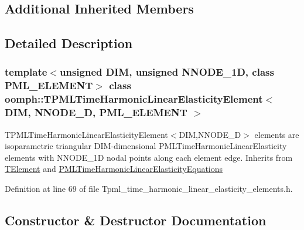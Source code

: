 \subsection*{Additional Inherited Members}


\subsection{Detailed Description}
\subsubsection*{template$<$unsigned D\+IM, unsigned N\+N\+O\+D\+E\+\_\+1D, class P\+M\+L\+\_\+\+E\+L\+E\+M\+E\+NT$>$\newline
class oomph\+::\+T\+P\+M\+L\+Time\+Harmonic\+Linear\+Elasticity\+Element$<$ D\+I\+M, N\+N\+O\+D\+E\+\_\+D, P\+M\+L\+\_\+\+E\+L\+E\+M\+E\+N\+T $>$}

T\+P\+M\+L\+Time\+Harmonic\+Linear\+Elasticity\+Element$<$\+D\+I\+M,\+N\+N\+O\+D\+E\+\_\+D$>$ elements are isoparametric triangular D\+I\+M-\/dimensional P\+M\+L\+Time\+Harmonic\+Linear\+Elasticity elements with N\+N\+O\+D\+E\+\_\+1D nodal points along each element edge. Inherits from \hyperlink{classoomph_1_1TElement}{T\+Element} and \hyperlink{classoomph_1_1PMLTimeHarmonicLinearElasticityEquations}{P\+M\+L\+Time\+Harmonic\+Linear\+Elasticity\+Equations} 

Definition at line 69 of file Tpml\+\_\+time\+\_\+harmonic\+\_\+linear\+\_\+elasticity\+\_\+elements.\+h.



\subsection{Constructor \& Destructor Documentation}
\mbox{\label{classoomph_1_1TPMLTimeHarmonicLinearElasticityElement_a5ef9e0f7a53fc48ecd534642ab6aaf1b}} 
